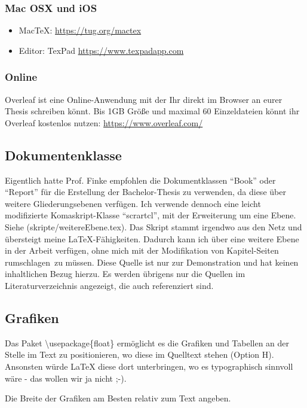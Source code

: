 \documentclass[12pt,oneside,titlepage]{scrartcl}
\begin{document}
\subsubsection{Mac OSX und iOS}
\begin{itemize}
\item MacTeX: \url{https://tug.org/mactex}
\item Editor: TexPad \url{https://www.texpadapp.com}
\end{itemize}

\subsubsection{Online}
Overleaf ist eine Online-Anwendung mit der Ihr direkt im Browser an eurer Thesis schreiben könnt. Bis 1GB Größe und maximal 60 Einzeldateien könnt ihr Overleaf kostenlos nutzen: \url{https://www.overleaf.com/}


\subsection{Dokumentenklasse}
Eigentlich hatte Prof. Finke empfohlen die Dokumentklassen \enquote{Book} oder \enquote{Report} für die Erstellung der Bachelor-Thesis zu verwenden, da diese über weitere Gliederungsebenen verfügen. Ich verwende dennoch eine leicht modifizierte Komaskript-Klasse \enquote{scrartcl}, mit der Erweiterung um eine Ebene. Siehe (skripte/weitereEbene.tex). Das Skript stammt irgendwo aus den Netz und übersteigt meine \LaTeX{}-Fähigkeiten. Dadurch kann ich über eine weitere Ebene in der Arbeit verfügen, ohne mich mit der Modifikation von Kapitel-Seiten rumschlagen~zu müssen. Diese Quelle ist nur zur Demonstration und hat keinen inhaltlichen Bezug hierzu. Es werden übrigens nur die Quellen im Literaturverzeichnis angezeigt, die auch referenziert sind.


\subsection{Grafiken}
Das Paket \textbackslash usepackage\{float\} ermöglicht es die Grafiken und Tabellen an der Stelle im Text zu positionieren, wo diese im Quelltext stehen (Option H). Ansonsten würde \LaTeX{} diese dort unterbringen, wo es typographisch sinnvoll wäre - das wollen wir ja nicht ;-).

Die Breite der Grafiken am Besten relativ zum Text angeben.
\end{document}

